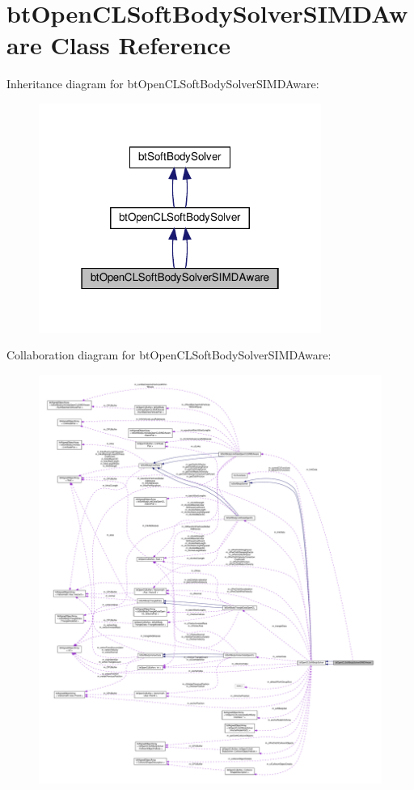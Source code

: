 \hypertarget{classbtOpenCLSoftBodySolverSIMDAware}{}\section{bt\+Open\+C\+L\+Soft\+Body\+Solver\+S\+I\+M\+D\+Aware Class Reference}
\label{classbtOpenCLSoftBodySolverSIMDAware}


Inheritance diagram for bt\+Open\+C\+L\+Soft\+Body\+Solver\+S\+I\+M\+D\+Aware\+:
\nopagebreak
\begin{figure}[H]
\begin{center}
\leavevmode
\includegraphics[width=262pt]{classbtOpenCLSoftBodySolverSIMDAware__inherit__graph}
\end{center}
\end{figure}


Collaboration diagram for bt\+Open\+C\+L\+Soft\+Body\+Solver\+S\+I\+M\+D\+Aware\+:
\nopagebreak
\begin{figure}[H]
\begin{center}
\leavevmode
\includegraphics[width=350pt]{classbtOpenCLSoftBodySolverSIMDAware__coll__graph}
\end{center}
\end{figure}
